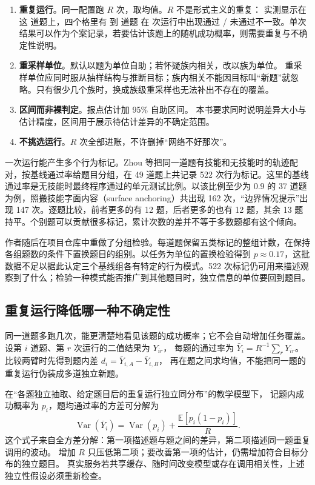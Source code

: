 \begin{enumerate}
  \item \textbf{重复运行}。同一配置跑 $R$ 次，取均值。$R$ 不是形式主义的重复：
        实测显示在这  道题上，四个格里有  到  道题
        在  次运行中出现通过 / 未通过不一致。单次结果可以作为个案记录，若要估计该题上的随机成功概率，则需要重复与不确定性说明。
  \item \textbf{重采样单位}。默认以题为单位自助；若怀疑族内相关，改以族为单位。
        重采样单位应同时服从抽样结构与推断目标；族内相关不能因目标叫“新题”就忽略。只有很少几个族时，换成族级重采样也无法补出不存在的覆盖。
  \item \textbf{区间而非裸判定}。报点估计加 95\% 自助区间。
        本书要求同时说明差异大小与估计精度，区间用于展示待估计差异的不确定范围。
  \item \textbf{不挑选运行}。$R$ 次全部进账，不许删掉“网络不好那次”。
\end{enumerate}

一次运行能产生多个行为标记。Zhou 等把同一道题有技能和无技能时的轨迹配对，按基线通过率给题目分组，在 49 道题上共记录 522 次行为标记\cite{zhou-cta-2605}。这里的基线通过率是无技能时最终程序通过的单元测试比例。以该比例至少为 0.9 的 37 道题为例，照搬技能字面内容（surface anchoring）共出现 162 次，“边界情况提示”出现 147 次。逐题比较，前者更多的有 12 题，后者更多的也有 12 题，其余 13 题持平。个别题可以贡献很多标记，累计次数的差并不等于多数题都有这个倾向。

作者随后在项目仓库中重做了分组检验。每道题保留五类标记的整组计数，在保持各组题数的条件下置换题目的组别。以任务为单位的置换检验得到 $p\approx0.17$，这批数据不足以据此认定三个基线组各有特定的行为模式\cite{zhou-cta-correction-2026}。522 次标记仍可用来描述观察到了什么；检验一种模式能否推广到其他题目时，独立信息的单位要回到题目。

\subsection{重复运行降低哪一种不确定性}

同一道题多跑几次，能更清楚地看见该题的成功概率；它不会自动增加任务覆盖。
设第 $i$ 道题、第 $r$ 次运行的二值结果为 $Y_{ir}$，
每题的通过率为 $\bar Y_i=R^{-1}\sum_rY_{ir}$。
比较两臂时先得到题内差 $d_i=\bar Y_{i,A}-\bar Y_{i,B}$，
再在题之间求均值，不能把同一题的重复运行伪装成多道独立新题。

在“各题独立抽取、给定题目后的重复运行独立同分布”的教学模型下，
记题内成功概率为 $p_i$，题均通过率的方差可分解为
\begin{equation}
 \operatorname{Var}(\bar Y_i)
 =\operatorname{Var}(p_i)+\frac{\mathbb E[p_i(1-p_i)]}{R}.
 \label{eq:ch03-repeat-variance}
\end{equation}
这个式子来自全方差分解：第一项描述题与题之间的差异，第二项描述同一题重复调用的波动。
增加 $R$ 只压低第二项；要改善第一项的估计，仍需增加符合目标分布的独立题目。
真实服务若共享缓存、随时间改变模型或存在调用相关性，上述独立性假设必须重新检查。

